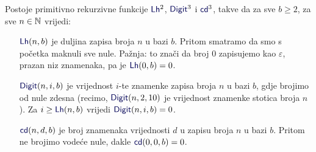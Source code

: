 \begin{lema}\label{lm:LhDigitcdprn}
Postoje primitivno rekurzivne funkcije $\f{Lh}^2$, $\f{Digit}^3$ i $\f{cd}^3$, takve da za sve $b\ge 2$, za sve $n\in{\mathbb N}$ vrijedi:
\begin{itemize}
    \item[$\f{Lh}(n,b)$] je duljina zapisa broja $n$ u bazi $b$. Pritom smatramo da smo s početka maknuli sve nule. Pažnja: to znači da broj $0$ zapisujemo kao $\varepsilon$, prazan niz znamenaka, pa je $\f{Lh}(0,b)=0$.
    \item[$\f{Digit}(n,i,b)$] je vrijednost $i$-te znamenke zapisa broja $n$ u bazi $b$, gdje brojimo od nule zdesna (recimo, $\f{Digit}(n,2,10)$ je vrijednost znamenke stotica broja $n$). Za $i\ge\f{Lh}(n,b)$ vrijedi $\f{Digit}(n,i,b)=0$.
    \item[$\f{cd}(n,d,b)$] je broj znamenaka vrijednosti $d$ u zapisu broja $n$ u bazi $b$. Pritom ne brojimo vodeće nule, dakle $\f{cd}(0,0,b)=0$.
\end{itemize}
\end{lema}
